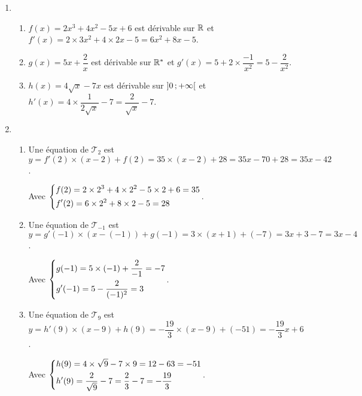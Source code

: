 \documentclass[a4paper,11pt]{article}
\begin{document}
\begin{enumerate}
	\item 
	\begin{enumerate}
		\item $f(x)=2x^3+4x^2-5x+6$ est dérivable sur $\R$ et $f'(x)=2 \times 3x^2 + 4 \times 2x -5 = 6x^2+8x-5$.
		\item $g(x)=5x+\dfrac{2}{x}$ est dérivable sur $\R^*$ et $g'(x)=5 + 2 \times \dfrac{-1}{x^2} = 5-\dfrac{2}{x^2}$.
		\item $h(x)=4\sqrt{x}-7x$ est dérivable sur $\mbox{\ensuremath{\left]0\mathpunct{};+\infty\right[}}$ et $h'(x)=4 \times \dfrac{1}{2\sqrt{x}} - 7 = \dfrac{2}{\sqrt{x}}-7$.
	\end{enumerate}
	\item 
	\begin{enumerate}
		\item Une équation de $\mathscr{T}_2$ est $y=f'(2) \times (x-2)+f(2)=35 \times (x-2) + 28 = 35x-70+28=35x-42$.
		
		Avec $\begin{dcases}f(2)=2 \times 2^3+4 \times 2^2 - 5 \times 2 +6 = 35 \\ f'(2)=6 \times 2^2+8 \times 2-5=28 \end{dcases}$.
		\item Une équation de $\mathscr{T}_{-1}$ est $y=g'(-1) \times (x-(-1)) + g(-1) = 3 \times (x+1) + (-7) = 3x+3-7=3x-4$.
		
		Avec $\begin{dcases}g(-1)=5 \times (-1) + \dfrac{2}{-1} = -7 \\ g'(-1)=5 -\dfrac{2}{(-1)^2}=3 \end{dcases}$.
		\item Une équation de $\mathscr{T}_9$ est $y=h'(9) \times (x-9)+h(9) = -\dfrac{19}{3} \times (x-9) + (-51) = -\dfrac{19}{3}x+6$.
		
		Avec $\begin{dcases}h(9)=4 \times \sqrt{9} - 7 \times 9 = 12-63 = -51 \\ h'(9)=\dfrac{2}{\sqrt{9}}-7 = \dfrac{2}{3} - 7 = -\dfrac{19}{3} \end{dcases}$.
	\end{enumerate}
\end{enumerate}

\newpage

\end{document}

